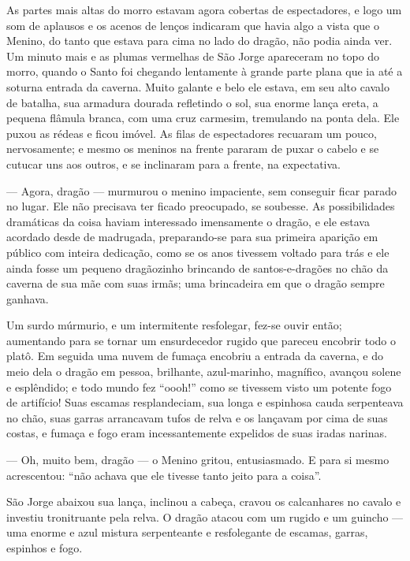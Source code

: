 As partes mais altas do morro estavam agora cobertas de espectadores,
e logo um som de aplausos e os acenos de lenços indicaram que havia
algo a vista que o Menino, do tanto que estava para cima no lado do
dragão, não podia ainda ver. Um minuto mais e as plumas vermelhas de
São Jorge apareceram no topo do morro, quando o Santo foi chegando
lentamente à grande parte plana que ia até a soturna entrada da
caverna. Muito galante e belo ele estava, em seu alto cavalo de
batalha, sua armadura dourada refletindo o sol, sua enorme lança
ereta, a pequena flâmula branca, com uma cruz carmesim, tremulando na
ponta dela. Ele puxou as rédeas e ficou imóvel. As filas de
espectadores recuaram um pouco, nervosamente; e mesmo os meninos na
frente pararam de puxar o cabelo e se cutucar uns aos outros, e se
inclinaram para a frente, na expectativa.

— Agora, dragão — murmurou o menino impaciente, sem conseguir ficar
parado no lugar. Ele não precisava ter ficado preocupado, se
soubesse. As possibilidades dramáticas da coisa haviam interessado
imensamente o dragão, e ele estava acordado desde de madrugada,
preparando-se para sua primeira aparição em público com inteira
dedicação, como se os anos tivessem voltado para trás e ele ainda
fosse um pequeno dragãozinho brincando de santos-e-dragões no chão da
caverna de sua mãe com suas irmãs; uma brincadeira em que o dragão
sempre ganhava.

Um surdo múrmurio, e um intermitente resfolegar, fez-se ouvir então;
aumentando para se tornar um ensurdecedor rugido que pareceu encobrir
todo o platô. Em seguida uma nuvem de fumaça encobriu a entrada da
caverna, e do meio dela o dragão em pessoa, brilhante, azul-marinho,
magnífico, avançou solene e esplêndido; e todo mundo fez “oooh!” como
se tivessem visto um potente fogo de artifício! Suas escamas
resplandeciam, sua longa e espinhosa cauda serpenteava no chão, suas
garras arrancavam tufos de relva e os lançavam por cima de suas
costas, e fumaça e fogo eram incessantemente expelidos de suas iradas
narinas. 

— Oh, muito bem, dragão — o Menino gritou, entusiasmado. E para si
mesmo acrescentou: “não achava que ele tivesse tanto jeito para a
coisa”.

São Jorge abaixou sua lança, inclinou a cabeça, cravou os calcanhares
no cavalo e investiu tronitruante pela relva. O dragão atacou com um
rugido e um guincho — uma enorme e azul mistura serpenteante e
resfolegante de escamas, garras, espinhos e fogo.

